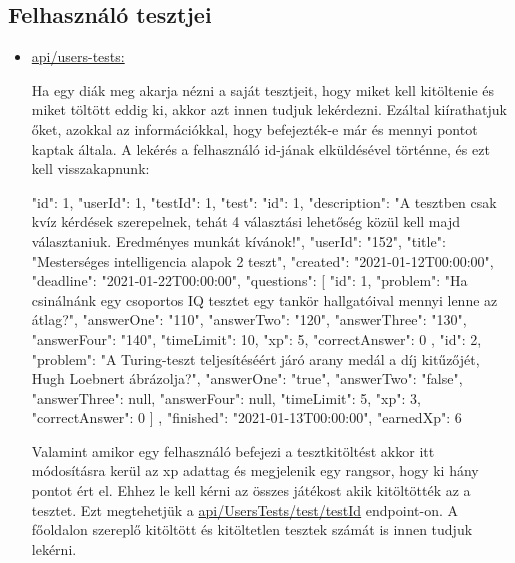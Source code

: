 \subsection{Felhasználó tesztjei}
\begin{itemize}[label={$\bullet$}, topsep=0pt, itemsep=0pt, leftmargin=15pt]
    \item[] {\url{api/users-tests:}}
          \begin{addmargin}[\parindent]{0pt}
              Ha egy diák meg akarja nézni a saját tesztjeit, hogy miket kell kitöltenie és miket töltött eddig ki, akkor azt innen tudjuk lekérdezni. Ezáltal kiírathatjuk őket, azokkal az információkkal, hogy befejezték-e már és mennyi pontot kaptak általa. A lekérés a felhasználó id-jának elküldésével történne, és ezt kell visszakapnunk:
              \begin{json}
{
    "id": 1,
    "userId": 1,
    "testId": 1,
    "test": {
        "id": 1,
        "description": "A tesztben csak kvíz kérdések szerepelnek, tehát 4 választási lehetőség közül kell majd választaniuk. Eredményes munkát kívánok!",
        "userId": "152",
        "title": "Mesterséges intelligencia alapok 2 teszt",
        "created": "2021-01-12T00:00:00",
        "deadline": "2021-01-22T00:00:00",
        "questions": [
            {
                "id": 1,
                "problem": "Ha csinálnánk egy csoportos IQ tesztet egy tankör hallgatóival mennyi lenne az átlag?",
                "answerOne": "110",
                "answerTwo": "120",
                "answerThree": "130",
                "answerFour": "140",
                "timeLimit": 10,
                "xp": 5,
                "correctAnswer": 0
            },
            {
                "id": 2,
                "problem": "A Turing-teszt teljesítéséért járó arany medál a díj kitűzőjét, Hugh Loebnert ábrázolja?",
                "answerOne": "true",
                "answerTwo": "false",
                "answerThree": null,
                "answerFour": null,
                "timeLimit": 5,
                "xp": 3,
                "correctAnswer": 0
            }
        ]
},
"finished": "2021-01-13T00:00:00",
"earnedXp": 6
}
              \end{json}

              Valamint amikor egy felhasználó befejezi a tesztkitöltést akkor itt módosításra kerül az xp adattag és megjelenik egy rangsor, hogy ki hány pontot ért el. Ehhez le kell kérni az összes játékost akik kitöltötték az a tesztet. Ezt megtehetjük a \url{api/UsersTests/test/testId} endpoint-on. A főoldalon szereplő kitöltött és kitöltetlen tesztek számát is innen tudjuk lekérni.
          \end{addmargin}
\end{itemize}
